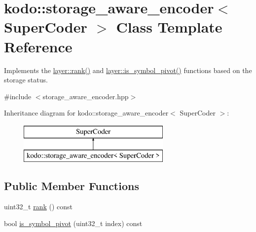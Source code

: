 \hypertarget{classkodo_1_1storage__aware__encoder}{\section{kodo\-:\-:storage\-\_\-aware\-\_\-encoder$<$ Super\-Coder $>$ Class Template Reference}
\label{classkodo_1_1storage__aware__encoder}
}


Implements the \hyperlink{group__encoder__api_ga10c217148f82a6ed036563d3542cad72}{layer\-::rank()} and \hyperlink{group__encoder__api_ga72b86000f3b686b3d2791e71f4950dc6}{layer\-::is\-\_\-symbol\-\_\-pivot()} functions based on the storage status.  




{\ttfamily \#include $<$storage\-\_\-aware\-\_\-encoder.\-hpp$>$}

Inheritance diagram for kodo\-:\-:storage\-\_\-aware\-\_\-encoder$<$ Super\-Coder $>$\-:\begin{figure}[H]
\begin{center}
\leavevmode
\includegraphics[height=2.000000cm]{classkodo_1_1storage__aware__encoder}
\end{center}
\end{figure}
\subsection*{Public Member Functions}
\begin{DoxyCompactItemize}
\item 
uint32\-\_\-t \hyperlink{classkodo_1_1storage__aware__encoder_a25d84a021cec32e455bd36f81ee50664}{rank} () const 
\begin{DoxyCompactList}\small\item\em \end{DoxyCompactList}\item 
bool \hyperlink{classkodo_1_1storage__aware__encoder_aa0ca84e51f4d6c6efc7a1161c1345a16}{is\-\_\-symbol\-\_\-pivot} (uint32\-\_\-t index) const 
\begin{DoxyCompactList}\small\item\em \end{DoxyCompactList}\end{DoxyCompactItemize}


